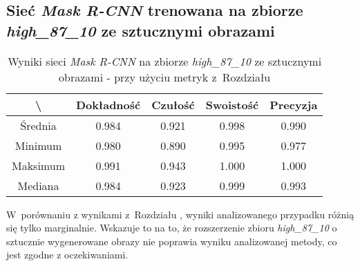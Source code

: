 \subsection{Sieć \textit{Mask R-CNN} trenowana na zbiorze \textit{high\_87\_10} ze sztucznymi obrazami}
\label{sec:results_high_original_generated}

\begin{table}[H]
	\centering
	\caption{Wyniki sieci \textit{Mask R-CNN} na zbiorze \textit{high\_87\_10} ze sztucznymi obrazami - przy użyciu metryk z~Rozdziału }
	\vspace{6pt}
	{\footnotesize
		\begin{tabular}{|c|c|c|c|c|}
      \hline \textbackslash & Dokładność & Czułość & Swoistość & Precyzja \\
      \hline Średnia & 0.984 & 0.921 & 0.998 & 0.990 \\
      \hline Minimum & 0.980 & 0.890 & 0.995 & 0.977 \\
      \hline Maksimum & 0.991 & 0.943 & 1.000 & 1.000 \\
      \hline Mediana & 0.984 & 0.923 & 0.999 & 0.993 \\
      \hline
		\end{tabular}
	}
  \vspace{0pt}
  \label{Tab:high_original_generated_calculated}
\end{table}

W~porównaniu z wynikami z~Rozdziału , wyniki analizowanego przypadku różnią się tylko marginalnie. Wskazuje to na to, że rozszerzenie zbioru \textit{high\_87\_10} o sztucznie wygenerowane obrazy nie poprawia wyniku analizowanej metody, co jest zgodne z oczekiwaniami.
